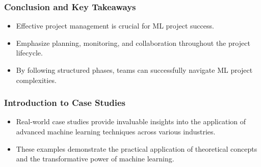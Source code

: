 \documentclass[aspectratio=169]{beamer}
\begin{document}
\begin{frame}
    \frametitle{Conclusion and Key Takeaways}
    \begin{itemize}
        \item Effective project management is crucial for ML project success.
        \item Emphasize planning, monitoring, and collaboration throughout the project lifecycle.
        \item By following structured phases, teams can successfully navigate ML project complexities.
    \end{itemize}
\end{frame}

\begin{frame}[fragile]
    \frametitle{Introduction to Case Studies}
    \begin{itemize}
        \item Real-world case studies provide invaluable insights into the application of advanced machine learning techniques across various industries.
        \item These examples demonstrate the practical application of theoretical concepts and the transformative power of machine learning.
    \end{itemize}
\end{frame}
\end{document}
